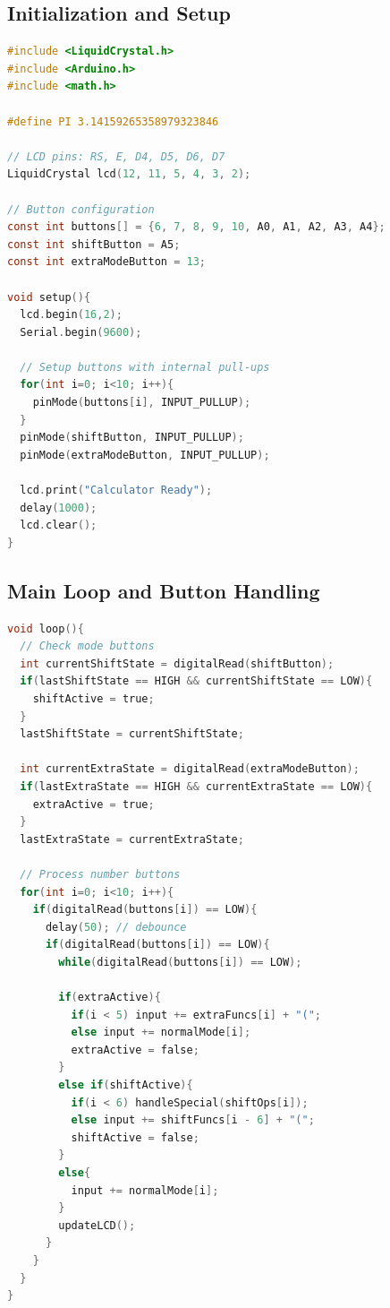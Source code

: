 \documentclass[journal]{IEEEtran}
\begin{document}
\subsection*{Initialization and Setup}
\begin{lstlisting}[language=C, frame=single, basicstyle=\ttfamily\small, keywordstyle=\color{blue}]
#include <LiquidCrystal.h>
#include <Arduino.h>
#include <math.h>

#define PI 3.14159265358979323846

// LCD pins: RS, E, D4, D5, D6, D7
LiquidCrystal lcd(12, 11, 5, 4, 3, 2);

// Button configuration
const int buttons[] = {6, 7, 8, 9, 10, A0, A1, A2, A3, A4};
const int shiftButton = A5;
const int extraModeButton = 13;

void setup(){
  lcd.begin(16,2);
  Serial.begin(9600);
  
  // Setup buttons with internal pull-ups
  for(int i=0; i<10; i++){
    pinMode(buttons[i], INPUT_PULLUP);
  }
  pinMode(shiftButton, INPUT_PULLUP);
  pinMode(extraModeButton, INPUT_PULLUP);
  
  lcd.print("Calculator Ready");
  delay(1000);
  lcd.clear();
}
\end{lstlisting}

\subsection*{Main Loop and Button Handling}
\begin{lstlisting}[language=C, frame=single, basicstyle=\ttfamily\small, keywordstyle=\color{blue}]
void loop(){
  // Check mode buttons
  int currentShiftState = digitalRead(shiftButton);
  if(lastShiftState == HIGH && currentShiftState == LOW){
    shiftActive = true;
  }
  lastShiftState = currentShiftState;
  
  int currentExtraState = digitalRead(extraModeButton);
  if(lastExtraState == HIGH && currentExtraState == LOW){
    extraActive = true;
  }
  lastExtraState = currentExtraState;
  
  // Process number buttons
  for(int i=0; i<10; i++){
    if(digitalRead(buttons[i]) == LOW){
      delay(50); // debounce
      if(digitalRead(buttons[i]) == LOW){
        while(digitalRead(buttons[i]) == LOW);
        
        if(extraActive){
          if(i < 5) input += extraFuncs[i] + "(";
          else input += normalMode[i];
          extraActive = false;
        }
        else if(shiftActive){
          if(i < 6) handleSpecial(shiftOps[i]);
          else input += shiftFuncs[i - 6] + "(";
          shiftActive = false;
        }
        else{
          input += normalMode[i];
        }
        updateLCD();
      }
    }
  }
}
\end{lstlisting}
\end{document}
